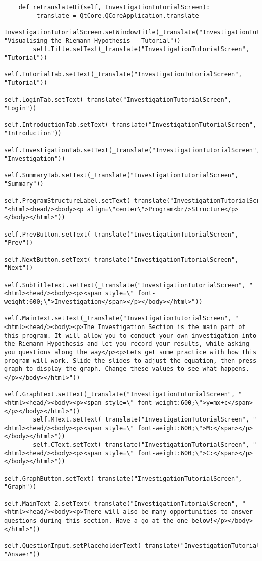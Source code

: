 \documentclass{article}
\begin{document}
\begin{lstlisting}
    def retranslateUi(self, InvestigationTutorialScreen):
        _translate = QtCore.QCoreApplication.translate
        InvestigationTutorialScreen.setWindowTitle(_translate("InvestigationTutorialScreen", "Visualising the Riemann Hypothesis - Tutorial"))
        self.Title.setText(_translate("InvestigationTutorialScreen", "Tutorial"))
        self.TutorialTab.setText(_translate("InvestigationTutorialScreen", "Tutorial"))
        self.LoginTab.setText(_translate("InvestigationTutorialScreen", "Login"))
        self.IntroductionTab.setText(_translate("InvestigationTutorialScreen", "Introduction"))
        self.InvestigationTab.setText(_translate("InvestigationTutorialScreen", "Investigation"))
        self.SummaryTab.setText(_translate("InvestigationTutorialScreen", "Summary"))
        self.ProgramStructureLabel.setText(_translate("InvestigationTutorialScreen", "<html><head/><body><p align=\"center\">Program<br/>Structure</p></body></html>"))
        self.PrevButton.setText(_translate("InvestigationTutorialScreen", "Prev"))
        self.NextButton.setText(_translate("InvestigationTutorialScreen", "Next"))
        self.SubTitleText.setText(_translate("InvestigationTutorialScreen", "<html><head/><body><p><span style=\" font-weight:600;\">Investigation</span></p></body></html>"))
        self.MainText.setText(_translate("InvestigationTutorialScreen", "<html><head/><body><p>The Investigation Section is the main part of this program. It will allow you to conduct your own investigation into the Riemann Hypothesis and let you record your results, while asking you questions along the way</p><p>Lets get some practice with how this program will work. Slide the slides to adjust the equation, then press graph to display the graph. Change these values to see what happens.</p></body></html>"))
        self.GraphText.setText(_translate("InvestigationTutorialScreen", "<html><head/><body><p><span style=\" font-weight:600;\">y=mx+c</span></p></body></html>"))
        self.MText.setText(_translate("InvestigationTutorialScreen", "<html><head/><body><p><span style=\" font-weight:600;\">M:</span></p></body></html>"))
        self.CText.setText(_translate("InvestigationTutorialScreen", "<html><head/><body><p><span style=\" font-weight:600;\">C:</span></p></body></html>"))
        self.GraphButton.setText(_translate("InvestigationTutorialScreen", "Graph"))
        self.MainText_2.setText(_translate("InvestigationTutorialScreen", "<html><head/><body><p>There will also be many opportunities to answer questions during this section. Have a go at the one below!</p></body></html>"))
        self.QuestionInput.setPlaceholderText(_translate("InvestigationTutorialScreen", "Answer"))

\end{lstlisting}
\end{document}

